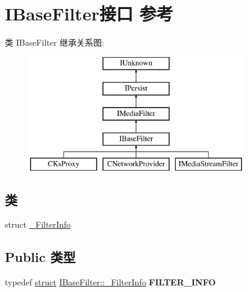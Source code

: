 \hypertarget{interface_i_base_filter}{}\section{I\+Base\+Filter接口 参考}
\label{interface_i_base_filter}
类 I\+Base\+Filter 继承关系图\+:\begin{figure}[H]
\begin{center}
\leavevmode
\includegraphics[height=5.000000cm]{interface_i_base_filter}
\end{center}
\end{figure}
\subsection*{类}
\begin{DoxyCompactItemize}
\item 
struct \hyperlink{struct_i_base_filter_1_1___filter_info}{\+\_\+\+Filter\+Info}
\end{DoxyCompactItemize}
\subsection*{Public 类型}
\begin{DoxyCompactItemize}
\item 
\mbox{\label{interface_i_base_filter_a62280115a774769df2743f0326ed70d8}} 
typedef \hyperlink{interfacestruct}{struct} \hyperlink{struct_i_base_filter_1_1___filter_info}{I\+Base\+Filter\+::\+\_\+\+Filter\+Info} {\bfseries F\+I\+L\+T\+E\+R\+\_\+\+I\+N\+FO}
\end{DoxyCompactItemize}
